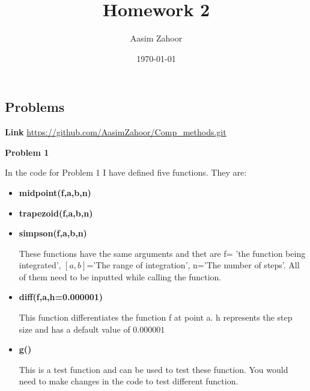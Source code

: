 \documentclass{article}
\title{Homework 2}
\author{Aasim Zahoor}
\date\today
\begin{document}
\maketitle 


\begin{center}
\section{Problems}
\end{center}
\textbf{Link}\vspace{1.5em}
\url{https://github.com/AasimZahoor/Comp_methods.git}
\vspace{1.5em}

\textbf{Problem 1}\vspace{1.5em}

In the code for Problem 1 I have defined five functions. They are:
\begin{itemize}
\item{\textbf{midpoint(f,a,b,n)}}\item{\textbf{trapezoid(f,a,b,n)}}\item{\textbf{simpson(f,a,b,n)}}\vspace{0.2em}

These functions have the same arguments and thet are f= 'the function being integrated', $[a,b]$='The range of integration', n='The number of steps'. All of them need to be inputted while calling the function.
\vspace{0.2em}

\item{\textbf{diff(f,a,h=0.000001)}}\vspace{0.2em}

This function differentiates the function f at point a. h represents the step size and has a default value of $0.000001$\vspace{0.2em}

\item{\textbf{g()}}\vspace{0.2em}

This is a test function and can be used to test these function. You would need to make changes in the code to test different function.
\vspace{0.2em}
\end{itemize}
\end{document}
